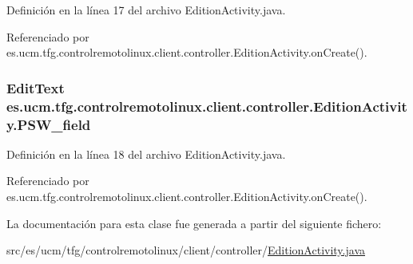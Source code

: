 Definición en la línea 17 del archivo Edition\-Activity.\-java.



Referenciado por es.\-ucm.\-tfg.\-controlremotolinux.\-client.\-controller.\-Edition\-Activity.\-on\-Create().

\hypertarget{classes_1_1ucm_1_1tfg_1_1controlremotolinux_1_1client_1_1controller_1_1EditionActivity_a4521b2b151cf1680726d7f1f4d0b1018}{
\subsubsection[{P\-S\-W\-\_\-field}]{\setlength{\rightskip}{0pt plus 5cm}Edit\-Text es.\-ucm.\-tfg.\-controlremotolinux.\-client.\-controller.\-Edition\-Activity.\-P\-S\-W\-\_\-field\hspace{0.3cm}{\ttfamily [private]}}}\label{classes_1_1ucm_1_1tfg_1_1controlremotolinux_1_1client_1_1controller_1_1EditionActivity_a4521b2b151cf1680726d7f1f4d0b1018}


Definición en la línea 18 del archivo Edition\-Activity.\-java.



Referenciado por es.\-ucm.\-tfg.\-controlremotolinux.\-client.\-controller.\-Edition\-Activity.\-on\-Create().



La documentación para esta clase fue generada a partir del siguiente fichero\-:\begin{DoxyCompactItemize}
\item 
src/es/ucm/tfg/controlremotolinux/client/controller/\hyperlink{EditionActivity_8java}{Edition\-Activity.\-java}\end{DoxyCompactItemize}
